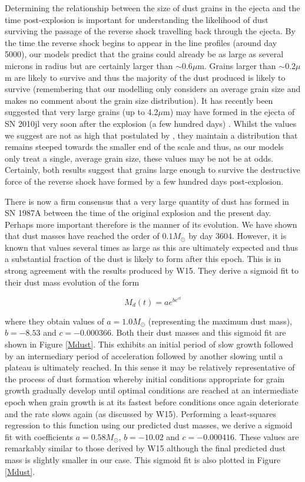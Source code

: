 Determining the relationship between the size of dust grains in the ejecta 
and the time post-explosion is important for understanding the likelihood 
of dust surviving the passage of the reverse shock travelling back through 
the ejecta. By the time the reverse shock begins to appear in the line 
profiles (around day 5000), our models predict that the grains could 
already be as large as several microns in radius but are certainly larger 
than $\sim 0.6\mu$m.  Grains larger than $\sim 0.2\mu$m are likely to 
survive and thus the majority of the dust produced is likely to survive 
(remembering that our modelling only considers an average grain size and 
makes no comment about the grain size distribution).  It has recently been 
suggested that very large grains (up to 4.2$\mu$m) may have formed in the 
ejecta of SN 2010jl very soon after the explosion (a few hundred days) 
\cite{Gall2014}.  Whilst the values we suggest are not as high that 
postulated by \citet{Gall2014}, they maintain a distribution that remains 
steeped towards the smaller end of the scale and thus, as our models only 
treat a single, average grain size, these values may be not be at odds.  
Certainly, both results suggest that grains large enough to survive the 
destructive force of the reverse shock have formed by a few hundred days 
post-explosion.

There is now a firm consensus that a very large quantity of dust has 
formed in SN 1987A between the time of the original explosion and the 
present day.  Perhaps more important therefore is the manner of its 
evolution.  We have shown that dust masses have reached the order of 
$0.1M_{\odot}$ by day 3604.  However, it is known that values several 
times as large as this are ultimately expected and thus a substantial 
fraction of the dust is likely to form after this epoch.  This is in 
strong agreement with the results produced by W15.  They derive a sigmoid 
fit to their dust mass evolution of the form

\begin{equation}
M_d(t)=ae^{be^{ct}}
\end{equation}
 
where they obtain values of $a=1.0M_{\odot}$ (representing the maximum 
dust mass), $b=-8.53$ and $c=-0.000366$.  Both their dust masses and this 
sigmoid fit are shown in Figure \ref{Mdust}.  This exhibits an initial 
period of slow growth followed by an intermediary period of acceleration 
followed by another slowing until a plateau is ultimately reached.  In 
this sense it may be relatively representative of the process of dust 
formation whereby initial conditions appropriate for grain growth 
gradually develop until optimal conditions are reached at an intermediate 
epoch when grain growth is at its fastest before conditions once again 
deteriorate and the rate slows again (as discussed by W15).  Performing a 
least-squares regression to this function using our predicted dust masses, 
we derive a sigmoid fit with coefficients $a=0.58M_{\odot}$, $b=-10.02$ 
and $c=-0.000416$.  These values are remarkably similar to those derived 
by W15 although the final predicted dust mass is slightly smaller in our 
case.  This sigmoid fit is also plotted in Figure \ref{Mdust}.

